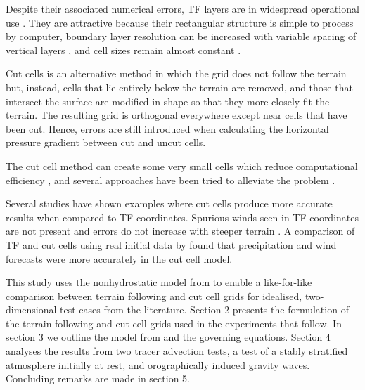 \documentclass[twocol]{ametsoc}
\begin{document}
Despite their associated numerical errors, TF layers are in widespread operational use \citep{steppeler2003}.  They are attractive because their rectangular structure is simple to process by computer, boundary layer resolution can be increased with variable spacing of vertical layers \citep{schaer2002}, and cell sizes remain almost constant \citep{jebens2011}.

Cut cells is an alternative method in which the grid does not follow the terrain but, instead, cells that lie entirely below the terrain are removed, and those that intersect the surface are modified in shape so that they more closely fit the terrain.  The resulting grid is orthogonal everywhere except near cells that have been cut.  Hence, errors are still introduced when calculating the horizontal pressure gradient between cut and uncut cells.

The cut cell method can create some very small cells which reduce computational efficiency \citep{klein2009}, and several approaches have been tried to alleviate the problem \citep{steppeler2002,yamazaki-satomura2010,jebens2011}.

Several studies have shown examples where cut cells produce more accurate results when compared to TF coordinates.  Spurious winds seen in TF coordinates are not present and errors do not increase with steeper terrain \citep{good2014}.  A comparison of TF and cut cells using real initial data by \citet{steppeler2013} found that precipitation and wind forecasts were more accurately in the cut cell model.

This study uses the nonhydrostatic model from \citet{weller-shahrokhi2014} to enable a like-for-like comparison between terrain following and cut cell grids for idealised, two-dimensional test cases from the literature.  Section 2 presents the formulation of the terrain following and cut cell grids used in the experiments that follow.  In section 3 we outline the model from \citet{weller-shahrokhi2014} and the governing equations.  Section 4 analyses the results from two tracer advection tests, a test of a stably stratified atmosphere initially at rest, and orographically induced gravity waves.  Concluding remarks are made in section 5.

\begin{figure*}
	\centering
	\caption{Examples of (a) BTF, (b) SLEVE, and (c) a cut cell grid, showing cell edges in the lowest four layers.  The two dimensional grids are \SI{20}{\kilo\meter} wide and \SI{20}{\kilo\meter} high.  SLEVE parameters are specified in the resting atmosphere test in section~\ref{sec:results}\ref{sec:resting}.  The cut cell grid was created by intersecting the terrain surface with a regular grid as described in section~\ref{sec:grid}.}
	\label{fig:grid}
\end{figure*}
\end{document}
